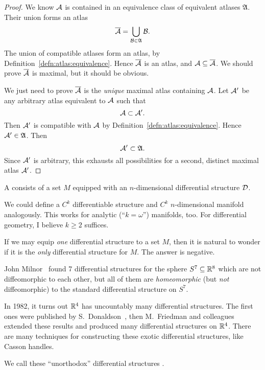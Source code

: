 \begin{proof}
We know $\mathcal{A}$ is contained in an equivalence class of equivalent
atlases $\mathfrak{A}$. Their union forms an atlas
\begin{equation}
\overline{\mathcal{A}}=\bigcup_{\mathcal{B}\in\mathfrak{A}}\mathcal{B}.
\end{equation}
The union of compatible atlases form an atlas, by Definition~\ref{defn:atlas:equivalence}.
Hence $\overline{\mathcal{A}}$ is an atlas, and $\mathcal{A}\subseteq\overline{\mathcal{A}}$.
We should prove $\overline{\mathcal{A}}$ is maximal, but it should be obvious.

We just need to prove $\overline{\mathcal{A}}$ is the \emph{unique} maximal atlas
containing $\mathcal{A}$. Let $\mathcal{A}'$ be any arbitrary atlas
equivalent to $\mathcal{A}$ such that
\begin{equation}
\atlas{A}\properSubset\atlas{A}'.
\end{equation}
Then $\mathcal{A}'$ is compatible with $\mathcal{A}$ by
Definition~\ref{defn:atlas:equivalence}. Hence
$\mathcal{A}'\in\mathfrak{A}$. Then
\begin{equation}
\atlas{A}'\properSubset\mathfrak{A}.
\end{equation}
Since $\mathcal{A}'$ is arbitrary, this exhausts all possibilities for a
second, distinct maximal atlas $\mathcal{A}'$.
\end{proof}

\begin{definition}
A  consists of
  a set $M$ equipped with an $n$-dimensional differential structure $\mathcal{D}$.
\end{definition}

\begin{remark}
We could define a $C^{k}$ differentiable structure and $C^{k}$
$n$-dimensional manifold analogously. This works for analytic
(``$k=\omega$'') manifolds, too. For differential geometry, I believe
$k\geq2$ suffices.
\end{remark}

\begin{remark}
If we may equip \emph{one} differential structure to a set $M$,
then it is natural to wonder if it is the \emph{only} differential
structure for $M$. The answer is negative.

John Milnor~\cite{milnor1956manifolds} found 7
differential structures for the sphere $S^{7}\subseteq\mathbb{R}^{8}$ which are
not diffeomorphic to each other, but all of them are \emph{homeomorphic}
(but \emph{not} diffeomorphic) to the standard differential structure on
$S^{7}$.

In 1982, it turns out $\mathbb{R}^{4}$ has uncountably many differential
structures. The first ones were published by
S.~Donaldson~\cite{donaldson1983self}, then M.~Friedman and colleagues extended
these results and produced many differential structures on $\mathbb{R}^{4}$.
There are many techniques for constructing these exotic differential
structures, like Casson handles.

We call these ``unorthodox'' differential structures
.
\end{remark}

